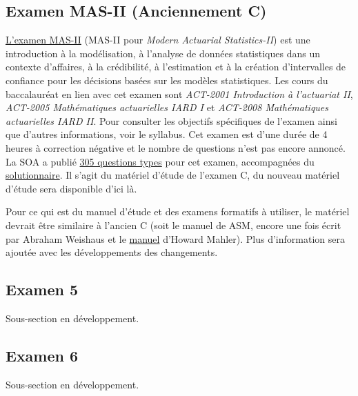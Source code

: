\subsection*{Examen MAS-II (Anciennement C)}
\label{subsec:examMAS_II}

\href{http://www.casact.org/admissions/syllabus/index.cfm?fa=MASII&parentID=392}{L'examen MAS-II} (MAS-II pour \textit{Modern Actuarial Statistics-II}) est une introduction à la modélisation, à l'analyse de données statistiques dans un contexte d'affaires, à la crédibilité, à l'estimation et à la création d'intervalles de confiance pour les décisions basées sur les modèles statistiques. Les cours du baccalauréat en lien avec cet examen sont \textit{ACT-2001 Introduction à l'actuariat II}, \textit{ACT-2005 Mathématiques actuarielles IARD I} et \textit{ACT-2008 Mathématiques actuarielles IARD II}. Pour consulter les objectifs spécifiques de l'examen ainsi que d'autres informations, voir le syllabus. Cet examen est d'une durée de 4 heures à correction négative et le nombre de questions n'est pas encore annoncé. La SOA a publié \href{http://www.soa.org/files/edu/edu-exam-c-sample-quest.pdf}{305 questions types} pour cet examen, accompagnées du \href{http://www.soa.org/files/edu/edu-exam-c-sample-sol.pdf}{solutionnaire}. Il s'agit du matériel d'étude de l'examen C, du nouveau matériel d'étude sera disponible d'ici là.\vspace{\baselineskip}

Pour ce qui est du manuel d'étude et des examens formatifs à utiliser, le matériel devrait être similaire à l'ancien C (soit le manuel de ASM, encore une fois écrit par Abraham Weishaus et le \href{http://howardmahler.com/Teaching/C.html}{manuel} d'Howard Mahler). Plus d'information sera ajoutée avec les développements des changements.\vspace{\baselineskip}

\subsection*{Examen 5}
\label{subsec:exam5}

Sous-section en développement. \vspace{\baselineskip}


\subsection*{Examen 6}
\label{subsec:exam6}

Sous-section en développement. \vspace{\baselineskip}


\newpage
